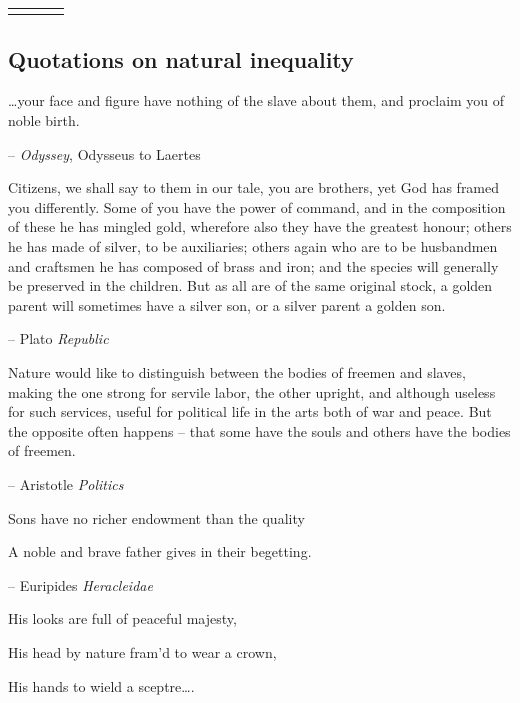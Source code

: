 \documentclass[
]{article}
\begin{document}
\begin{table}[ht]
\begin{centerbox}
\begin{threeparttable}
\begin{tabularx}{0.8\textwidth}{p{} p{} p{} p{}}
\hhline{}
\arrayrulecolor{black}
\end{tabularx}
\end{threeparttable}\par\end{centerbox}

\end{table}
 

\FloatBarrier

\clearpage

\hypertarget{quotations-on-natural-inequality}{%
\subsection{Quotations on natural inequality}\label{quotations-on-natural-inequality}}

\ldots your face and figure have nothing of the slave about them, and
proclaim you of noble birth.

-- \emph{Odyssey}, Odysseus to Laertes

Citizens, we shall say to them in our tale, you are brothers, yet God
has framed you differently. Some of you have the power of command, and
in the composition of these he has mingled gold, wherefore also they
have the greatest honour; others he has made of silver, to be
auxiliaries; others again who are to be husbandmen and craftsmen he has
composed of brass and iron; and the species will generally be preserved
in the children. But as all are of the same original stock, a golden
parent will sometimes have a silver son, or a silver parent a golden
son.

-- Plato \emph{Republic}

Nature would like to distinguish between the bodies of freemen and
slaves, making the one strong for servile labor, the other upright, and
although useless for such services, useful for political life in the
arts both of war and peace. But the opposite often happens -- that some
have the souls and others have the bodies of freemen.

-- Aristotle \emph{Politics}

Sons have no richer endowment than the quality

A noble and brave father gives in their begetting.

-- Euripides \emph{Heracleidae}

His looks are full of peaceful majesty,

His head by nature fram'd to wear a crown,

His hands to wield a sceptre\ldots.
\end{document}

